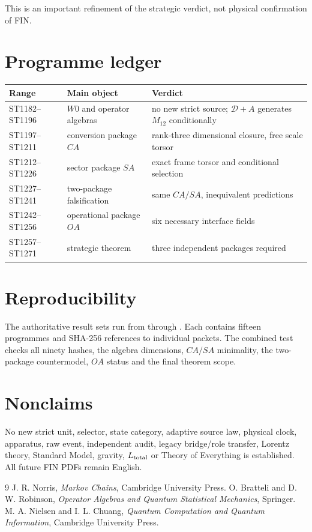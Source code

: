 \documentclass[11pt,a4paper]{article}
\begin{document}
This is an important refinement of the strategic verdict, not physical
confirmation of FIN.

\appendix
\section{Programme ledger}
\begin{longtable}{@{}p{}p{}p{}@{}}
\toprule
Range & Main object & Verdict \\
\midrule\endhead
ST1182--ST1196 & $W0$ and operator algebras & no new strict source; $\mathcal D+A$ generates $M_{12}$ conditionally \\
ST1197--ST1211 & conversion package $CA$ & rank-three dimensional closure, free scale torsor \\
ST1212--ST1226 & sector package $SA$ & exact frame torsor and conditional selection \\
ST1227--ST1241 & two-package falsification & same $CA/SA$, inequivalent predictions \\
ST1242--ST1256 & operational package $OA$ & six necessary interface fields \\
ST1257--ST1271 & strategic theorem & three independent packages required \\
\bottomrule
\end{longtable}

\section{Reproducibility}
The authoritative result sets run from
 through
.  Each contains fifteen programmes and
SHA-256 references to individual packets.  The combined test
 checks all ninety hashes, the algebra
dimensions, $CA/SA$ minimality, the two-package countermodel, $OA$ status and
the final theorem scope.

\section{Nonclaims}
No new strict unit, selector, state category, adaptive source law, physical
clock, apparatus, raw event, independent audit, legacy bridge/role transfer,
Lorentz theory, Standard Model, gravity, $L_{\rm total}$ or Theory of Everything
is established.  All future FIN PDFs remain English.

\begin{thebibliography}{9}
 J. R. Norris, \emph{Markov Chains}, Cambridge University Press.
 O. Bratteli and D. W. Robinson, \emph{Operator Algebras and Quantum Statistical Mechanics}, Springer.
 M. A. Nielsen and I. L. Chuang, \emph{Quantum Computation and Quantum Information}, Cambridge University Press.
\end{thebibliography}
\end{document}
